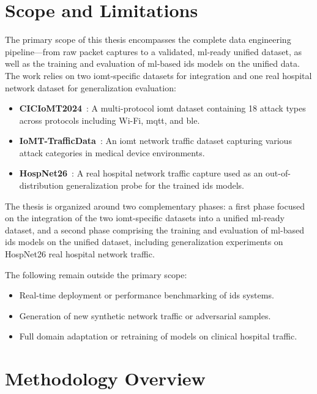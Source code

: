 \section{Scope and Limitations}
\label{sec:scope}

The primary scope of this thesis encompasses the complete data engineering pipeline---from raw packet captures to a validated, \gls{ml}-ready unified dataset, as well as the training and evaluation of \gls{ml}-based \gls{ids} models on the unified data. The work relies on two \gls{iomt}-specific datasets for integration and one real hospital network dataset for generalization evaluation:

\begin{itemize}
    \item \textbf{CICIoMT2024}~\cite{dadkhah2024ciciomt}: A multi-protocol \gls{iomt} dataset containing 18 attack types across protocols including Wi-Fi, \gls{mqtt}, and \gls{ble}.
    \item \textbf{IoMT-TrafficData}~\cite{areia2024iomt}: An \gls{iomt} network traffic dataset capturing various attack categories in medical device environments.
    \item \textbf{HospNet26}~\cite{hospnet26}: A real hospital network traffic capture used as an out-of-distribution generalization probe for the trained \gls{ids} models.
\end{itemize}

The thesis is organized around two complementary phases: a first phase focused on the integration of the two \gls{iomt}-specific datasets into a unified \gls{ml}-ready dataset, and a second phase comprising the training and evaluation of \gls{ml}-based \gls{ids} models on the unified dataset, including generalization experiments on HospNet26 real hospital network traffic.

The following remain outside the primary scope:

\begin{itemize}
    \item Real-time deployment or performance benchmarking of \gls{ids} systems.
    \item Generation of new synthetic network traffic or adversarial samples.
    \item Full domain adaptation or retraining of models on clinical hospital traffic.
\end{itemize}

\section{Methodology Overview}
\label{sec:methodology}

